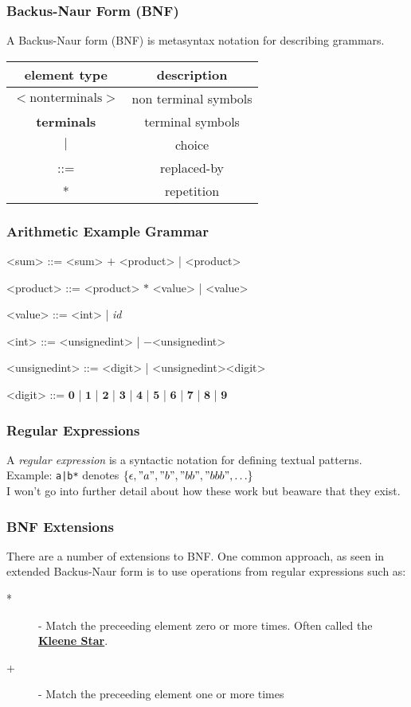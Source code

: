 \documentclass{beamer}
\begin{document}
\begin{frame}[fragile]
\frametitle{Backus-Naur Form (BNF)}
A Backus-Naur form (BNF) is metasyntax notation for describing grammars.

\begin{center}
  \begin{tabular}{ | c | c | }
    \hline
    element type & description \\ \hline\hline
    $<\mathrm{non terminals}>$ & non terminal symbols  \\ \hline
    \textbf{terminals} & terminal symbols  \\ \hline
    $|$ & choice  \\ \hline
    ::= & replaced-by  \\ \hline
    * & repetition \\
    \hline
  \end{tabular}
\end{center}

\end{frame}

\begin{frame}[fragile]
\frametitle{Arithmetic Example Grammar}
\begin{grammar}
<sum> ::= <sum> $\mathbf{+}$ <product> | <product>

<product> ::= <product> $\mathbf{*}$ <value> | <value>

<value> ::= <int> | \textit{id}

<int> ::= <unsignedint> | $\mathbf{-}$<unsignedint>

<unsignedint> ::= <digit> | <unsignedint><digit>

<digit> ::= $\mathbf{0}$ | $\mathbf{1}$ | $\mathbf{2}$ | $\mathbf{3}$ | $\mathbf{4}$ | $\mathbf{5}$ | $\mathbf{6}$ | $\mathbf{7}$ | $\mathbf{8}$ | $\mathbf{9}$
 \end{grammar}
\end{frame}


\begin{frame}
\frametitle{Regular Expressions}
A \textit{regular expression} is a syntactic notation for defining textual patterns. \\
\bigskip
Example: \texttt{a|b*} denotes ${\{ \epsilon, "a", "b", "bb", "bbb", \ldots \}}$ \\
\bigskip
I won't go into further detail about how these work but beaware that they exist.
\end{frame}


\begin{frame}[fragile]
\frametitle{BNF Extensions}
There are a number of extensions to BNF. One common approach, as seen in extended Backus-Naur form is to use operations from regular expressions such as:

\begin{description}
\item[*]  - Match the preceeding element zero or more times. Often called the \underline{\textbf{Kleene Star}}.
\item[+]  - Match the preceeding element one or more times
\end{description}

\end{frame}
\end{document}
